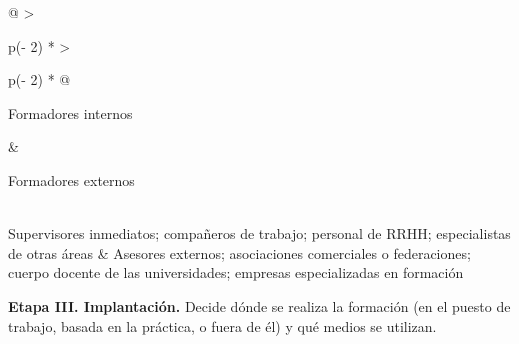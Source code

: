 \documentclass[12pt]{book} %
\begin{document}
\begin{longtable}[]{@{}
  >{\raggedright\arraybackslash}p{(\columnwidth - 2\tabcolsep) * }
  >{\raggedright\arraybackslash}p{(\columnwidth - 2\tabcolsep) * }@{}}
\toprule\noalign{}
\begin{minipage}[b]{\linewidth}\raggedright
Formadores internos
\end{minipage} & \begin{minipage}[b]{\linewidth}\raggedright
Formadores externos
\end{minipage} \\
\midrule\noalign{}
\endhead
\bottomrule\noalign{}
\endlastfoot
Supervisores inmediatos; compañeros de trabajo; personal de RRHH;
especialistas de otras áreas & Asesores externos; asociaciones
comerciales o federaciones; cuerpo docente de las universidades;
empresas especializadas en formación \\
\end{longtable}

\textbf{Etapa III. Implantación.} Decide dónde se realiza la formación
(en el puesto de trabajo, basada en la práctica, o fuera de él) y qué
medios se utilizan.
\end{document}
